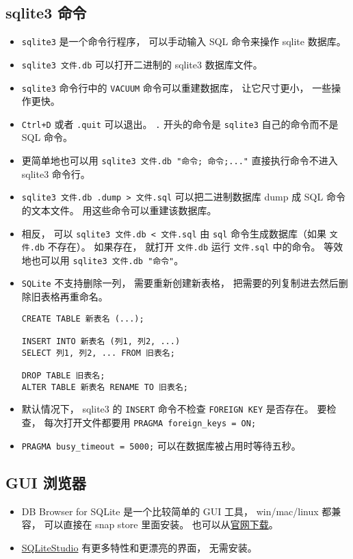 \subsection{sqlite3 命令}
\begin{itemize}
\item \verb|sqlite3| 是一个命令行程序， 可以手动输入 SQL 命令来操作 sqlite 数据库。
\item \verb|sqlite3 文件.db| 可以打开二进制的 sqlite3 数据库文件。
\item \verb|sqlite3| 命令行中的 \verb|VACUUM| 命令可以重建数据库， 让它尺寸更小， 一些操作更快。
\item \verb|Ctrl+D| 或者 \verb|.quit| 可以退出。 \verb|.| 开头的命令是 \verb|sqlite3| 自己的命令而不是 SQL 命令。
\item 更简单地也可以用 \verb|sqlite3 文件.db "命令; 命令;..."| 直接执行命令不进入 sqlite3 命令行。
\item \verb|sqlite3 文件.db .dump > 文件.sql| 可以把二进制数据库 dump 成 SQL 命令的文本文件。 用这些命令可以重建该数据库。
\item 相反， 可以 \verb|sqlite3 文件.db < 文件.sql| 由 \verb|sql| 命令生成数据库（如果 \verb|文件.db| 不存在）。 如果存在， 就打开 \verb|文件.db| 运行 \verb|文件.sql| 中的命令。 等效地也可以用 \verb|sqlite3 文件.db "命令"|。
\item \verb|SQLite| 不支持删除一列， 需要重新创建新表格， 把需要的列复制进去然后删除旧表格再重命名。
\begin{lstlisting}[language=none]
CREATE TABLE 新表名 (...);

INSERT INTO 新表名 (列1, 列2, ...)
SELECT 列1, 列2, ... FROM 旧表名;

DROP TABLE 旧表名;
ALTER TABLE 新表名 RENAME TO 旧表名;
\end{lstlisting}
\item 默认情况下， sqlite3 的 \verb|INSERT| 命令不检查 \verb|FOREIGN KEY| 是否存在。 要检查， 每次打开文件都要用 \verb|PRAGMA foreign_keys = ON;|
\item \verb|PRAGMA busy_timeout = 5000;| 可以在数据库被占用时等待五秒。
\end{itemize}

\subsection{GUI 浏览器}
\begin{itemize}
\item DB Browser for SQLite 是一个比较简单的 GUI 工具， win/mac/linux 都兼容， 可以直接在 snap store 里面安装。 也可以从\href{https://sqlitebrowser.org/dl/}{官网下载}。
\item \href{https://sqlitestudio.pl/}{SQLiteStudio} 有更多特性和更漂亮的界面， 无需安装。
\end{itemize}

